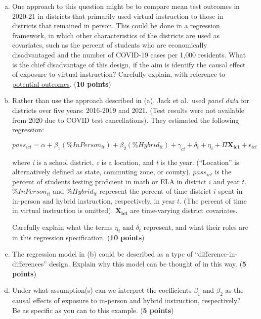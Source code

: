 \documentclass[12pt]{article}
\begin{document}
\begin{enumerate}[(a)]
\setlength\itemsep{2em}

\item One approach to this question might be to compare mean test outcomes in 2020-21 in districts that primarily used virtual instruction to those in districts that remained in person. This could be done in a regression framework, in which other characteristics of the districts are used as covariates, such as the percent of students who are economically disadvantaged and the number of COVID-19 cases per 1,000 residents. What is the chief disadvantage of this design, if the aim is identify the causal effect of exposure to virtual instruction? Carefully explain, with reference to \underline{potential outcomes}. ({\bf 10 points})


\item Rather than use the approach described in (a), Jack et al.\ used \textit{panel data} for districts over five years: 2016-2019 and 2021. (Test results were not available from 2020 due to COVID test cancellations). They estimated the following regression: 

$$ pass_{ict} = \alpha + \beta_1 (\%InPerson_{it}) + \beta_2 (\%Hybrid_{it}) + \gamma_{ct} + \delta_t + \eta_i + \Pi \mathbf{X_{ict}} + \epsilon_{ict} $$

where \textit{i} is a school district, \textit{c} is a location, and \textit{t} is the year. (``Location'' is alternatively defined as state, commuting zone, or county). $pass_{ict}$ is the percent of students testing proficient in math or ELA in district $i$ and year $t$. $\%InPerson_{it}$ and $\%Hybrid_{it}$ represent the percent of time district $i$ spent in in-person and hybrid instruction, respectively, in year $t$. (The percent of time in virtual instruction is omitted). $\mathbf{X_{ict}}$ are time-varying district covariates.

\medskip
Carefully explain what the terms $\eta_i$ and $\delta_t$ represent, and what their roles are in this regression specification. ({\bf 10 points})

\item The regression model in (b) could be described as a type of ``difference-in-differences'' design. Explain why this model can be thought of in this way.  ({\bf 5 points})

\item Under what assumption(s) can we interpret the coefficients $\beta_1$ and $\beta_2$ as the causal effects of exposure to in-person and hybrid instruction, respectively? Be as specific as you can to this example. ({\bf 5 points})


\end{enumerate}
\end{document}
